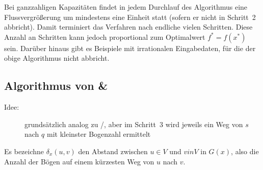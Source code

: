 Bei ganzzahligen Kapazitäten findet in jedem Durchlauf des Algorithmus eine Flussvergrößerung um mindestens eine Einheit statt (sofern er nicht in Schritt~2 abbricht). Damit terminiert das Verfahren nach endliche vielen Schritten. Diese Anzahl an Schritten kann jedoch proportional zum Optimalwert $f^\ast = f(x^\ast)$ sein.
Darüber hinaus gibt es Beispiele mit irrationalen Eingabedaten, für die der obige Algorithmus nicht abbricht.

\subsection{Algorithmus von  \& }

\begin{description}
	\item[Idee:] grundsätzlich analog zu /, aber im Schritt~3 wird jeweils ein Weg von $s$ nach $q$ mit kleinster Bogenzahl ermittelt
\end{description}

Es bezeichne $\delta_x(u,v)$ den Abstand zwischen $u \in V$ und $v in V$ in $G(x)$, also die Anzahl der Bögen auf einem kürzesten Weg von $u$ nach $v$.
